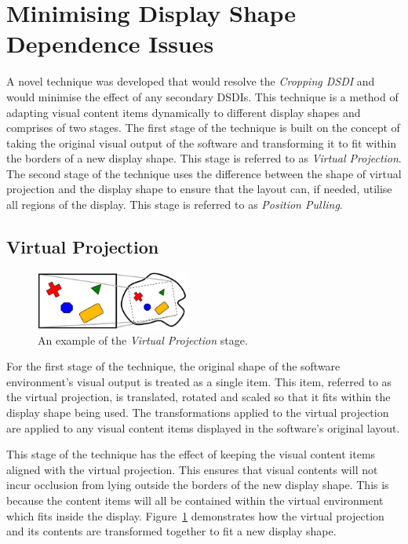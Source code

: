 \documentclass[twocolumn,compsoc]{cvm}
\begin{document}
\section{Minimising Display Shape Dependence Issues}
\label{sec:solution}

A novel technique was developed that would resolve the {\emph{Cropping \ac{DSDI}}} and would minimise the effect of any secondary \acp{DSDI}.
This technique is a method of adapting visual content items dynamically to different display shapes and comprises of two stages.
The first stage of the technique is built on the concept of taking the original visual output of the software and transforming it to fit within the borders of a new display shape.
This stage is referred to as {\em Virtual Projection}.
The second stage of the technique uses the difference between the shape of virtual projection and the display shape to ensure that the layout can, if needed, utilise all regions of the display.
This stage is referred to as {\em Position Pulling}.

\subsection{Virtual Projection}
\label{subsec:virtualprojection}

\begin{figure}[h!]
 \centering
   \includegraphics[width=0.45\textwidth]{figures/VirtualProjection.jpeg}
   \caption{An example of the {\emph{Virtual Projection}} stage.}
   \label{fig:virtualRectangle}
\end{figure}

For the first stage of the technique, the original shape of the software environment's visual output is treated as a single item.
This item, referred to as the virtual projection, is translated, rotated and scaled so that it fits within the display shape being used.
The transformations applied to the virtual projection are applied to any visual content items displayed in the software's original layout.

This stage of the technique has the effect of keeping the visual content items aligned with the virtual projection.
This ensures that visual contents will not incur occlusion from lying outside the borders of the new display shape.
This is because the content items will all be contained within the virtual environment which fits inside the display.
Figure~\ref{fig:virtualRectangle} demonstrates how the virtual projection and its contents are transformed together to fit a new display shape.
\end{document}
